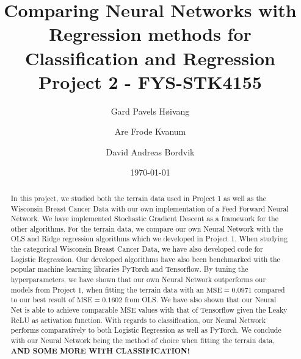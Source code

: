 \documentclass
[twocolumn,
secnumarabic,
nobibnotes,
aps,
prl,
reprint,
groupedaddress,
amsmath,
amssymb
]{revtex4-2}
\begin{document}

\title{Comparing Neural Networks with Regression methods for Classification and Regression\\Project 2 - FYS-STK4155}

\author{Gard Pavels Høivang}
\author{Are Frode Kvanum}
\author{David Andreas Bordvik}
\date{\today}

\begin{abstract}
  In this project, we studied both the terrain data used in Project 1 as well as the Wisconsin Breast Cancer Data with our own implementation of a Feed Forward Neural Network. We have implemented Stochastic Gradient Descent as a framework for the other algorithms. For the terrain data, we compare our own Neural Network with the OLS and Ridge regression algorithms which we developed in Project 1. When studying the categorical Wisconsin Breast Cancer Data, we have also developed code for Logistic Regression. Our developed algorithms have also been benchmarked with the popular machine learning libraries PyTorch and Tensorflow. By tuning the hyperparameters, we have shown that our own Neural Network outperforms our models from Project 1, when fitting the terrain data with an $\text{MSE} = 0.0971$ compared to our best result of $\text{MSE} = 0.1602$ from OLS. We have also shown that our Neural Net is able to achieve comparable MSE values with that of Tensorflow given the Leaky ReLU as activation function. With regards to classification, our Neural Network performs comparatively to both Logistic Regression as well as PyTorch. We conclude with our Neural Network being the method of choice when fitting the terrain data, \textbf{AND SOME MORE WITH CLASSIFICATION!}
\end{abstract}
\end{document}
